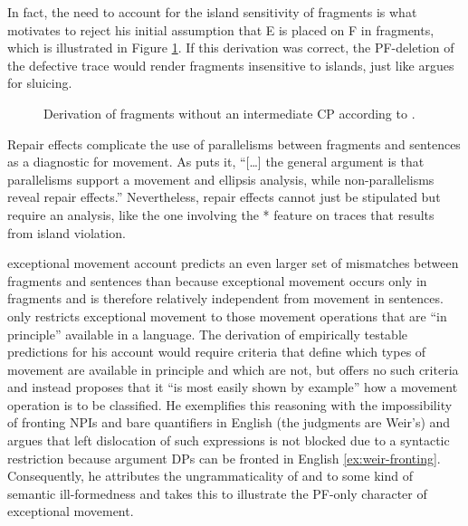 In fact, the need to account for the island sensitivity of fragments is what motivates \citeauthor{merchant2004} to reject his initial assumption that E is placed on F in fragments, which is illustrated in Figure \ref{ex:merchant.structure-reduced}. If this derivation was correct, the PF-deletion of the defective trace would render fragments insensitive to islands, just like \citet{merchant2001} argues for sluicing.
%
\begin{figure}
 
\caption{Derivation of fragments without an intermediate CP according to \citet[675]{merchant2004}.\label{ex:merchant.structure-reduced}} 
\end{figure}
%
Repair effects complicate the use of parallelisms between fragments and sentences as a diagnostic for movement. As \citet[711]{merchant2004} puts it, ``[\dots] the general argument is that parallelisms support a movement and ellipsis analysis, while non-parallelisms reveal repair effects.'' Nevertheless, repair effects cannot just be stipulated but require an analysis, like the one involving the * feature on traces that results from island violation.

 exceptional movement account predicts an even larger set of mismatches between fragments and sentences than \citet{merchant2004} because exceptional movement occurs only in fragments and is therefore relatively independent from movement in sentences. \citeauthor{weir2014} only restricts exceptional movement to those movement operations that are ``in principle'' available in a language.  The derivation of empirically testable predictions for his account would require criteria that define which types of movement are available in principle and which are not, but \citet[10]{weir2015} offers no such criteria and instead proposes that it ``is most easily shown by example'' how a movement operation is to be classified. He exemplifies this reasoning with the impossibility of fronting NPIs \Next[a] and bare quantifiers \NNext[a] in English (the judgments are Weir's) and argues that left dislocation of such expressions is not blocked due to a syntactic restriction because argument DPs can be fronted in English \ref{ex:weir-fronting}. Consequently, he attributes the ungrammaticality of \Next[a] and \NNext[a] to some kind of semantic ill-formedness and takes this to illustrate the PF-only character of exceptional movement.

